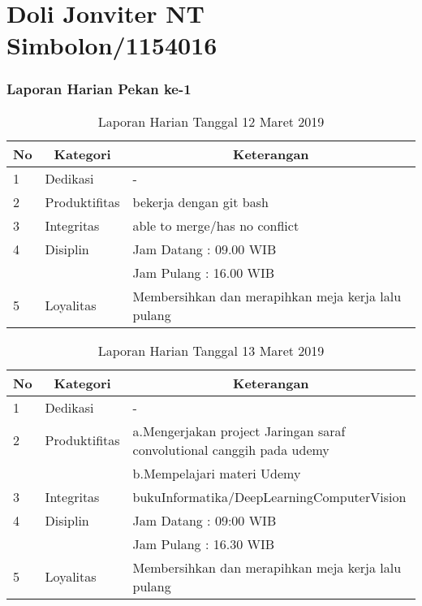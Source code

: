 \chapter{Doli Jonviter NT Simbolon/1154016}

\subsection{Laporan Harian Pekan ke-1}


\begin{table}[htp]
\caption{Laporan Harian Tanggal 12 Maret 2019}
\label{tab:lh120319}
\begin{tabular}{|l|l|l|}
\hline
\textbf{No} & \multicolumn{1}{c|}{\textbf{Kategori}} & \multicolumn{1}{c|}{\textbf{Keterangan}} \\ \hline
1 & Dedikasi & - \\ \hline
2 & Produktifitas & bekerja dengan git bash \\
3 & Integritas & able to merge/has no conflict \\ \hline
4 & Disiplin & Jam Datang : 09.00 WIB \\
 &  & Jam Pulang : 16.00 WIB \\ \hline
5 & Loyalitas & Membersihkan dan merapihkan meja kerja lalu pulang  \\ \hline
\end{tabular}
\end{table}



\begin{table}[htp]
\caption{Laporan Harian Tanggal 13 Maret 2019}
\label{tab:lh130319}
\begin{tabular}{|l|l|l|}
\hline
\textbf{No} & \multicolumn{1}{c|}{\textbf{Kategori}} & \multicolumn{1}{c|}{\textbf{Keterangan}} \\ \hline
1 & Dedikasi & - \\ \hline
2 & Produktifitas & a.Mengerjakan project Jaringan saraf convolutional canggih pada udemy \\
  & & b.Mempelajari materi Udemy \\ \hline
3 & Integritas & bukuInformatika/DeepLearningComputerVision \\ \hline
4 & Disiplin & Jam Datang : 09:00 WIB \\
 &  & Jam Pulang : 16.30 WIB \\ \hline
5 & Loyalitas & Membersihkan dan merapihkan meja kerja lalu pulang \\ \hline
\end{tabular}
\end{table}


